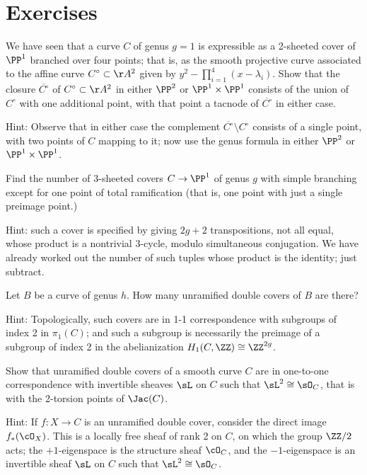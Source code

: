 \section{Exercises}
 \begin{exercise}
  We have seen that a curve $C$ of genus $g=1$ is expressible as a 2-sheeted cover of $\PP^1$ branched over four points; that is, as the smooth projective curve associated to the affine curve $C^\circ \subset \AA^2$ given by $y^2 - \prod_{i=1}^4 (x-\lambda_i)$. Show that the closure $\overline{C^\circ}$ of $C^\circ \subset \AA^2$ in either $\PP^2$ or $\PP^1 \times \PP^1$ consists of the union of $C^\circ$ with one additional point, with that point a tacnode of $\overline{C^\circ}$ in either case.
  
  Hint: Observe that in either case the complement $\overline{C^\circ} \setminus C^\circ$ consists of a single point, with two points of $C$ mapping to it; now use the genus formula in either $\PP^2$ or $\PP^1 \times \PP^1$. 
  \end{exercise}

\begin{exercise}
Find the number of 3-sheeted covers $C \to \PP^1$ of genus $g$ with simple branching except for one point of total ramification (that is, one point with just a single preimage point.)

Hint: such a cover is specified by giving $2g+2$ transpositions, not all equal, whose product is a nontrivial 3-cycle, modulo simultaneous conjugation. We have already worked out the number of such tuples whose product is the identity; just subtract.
\end{exercise}


\begin{exercise}
Let $B$ be a curve of genus $h$. How many unramified double covers of $B$ are there?

Hint: Topologically, such covers are in 1-1 correspondence with subgroups of index 2 in $\pi_1(C)$; and such a subgroup is necessarily the preimage of a subgroup of index 2 in the abelianization $H_1(C, \ZZ) \cong \ZZ^{2g}$.
\end{exercise}

\begin{exercise}
Show that unramified double covers of a smooth curve $C$ are in one-to-one correspondence
with invertible sheaves $\sL$ on $C$ such that $\sL^2 \cong \sO_C$, that is with the 2-torsion points
of $\Jac(C)$.

Hint: If $f : X \to C$ is an unramified double cover, consider the direct image $f_*(\cO_X)$. This is a locally free sheaf of rank 2 on $C$, on which the group $\ZZ/2$ acts; the $+1$-eigenspace is the structure sheaf $\cO_C$, and the $-1$-eigenspace is an invertible sheaf $\sL$ on $C$ such that $\sL^2 \cong \sO_C$.
\end{exercise}


